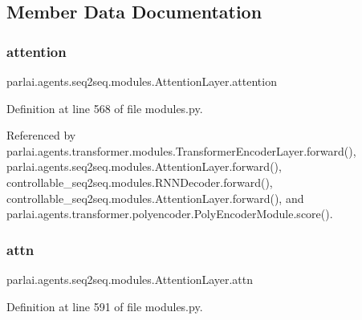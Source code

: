 \subsection{Member Data Documentation}
\mbox{\label{classparlai_1_1agents_1_1seq2seq_1_1modules_1_1AttentionLayer_a8582ed1bb09a75d9a54e812a1b4ae648}} 
\subsubsection{\texorpdfstring{attention}{attention}}
{\footnotesize\ttfamily parlai.\+agents.\+seq2seq.\+modules.\+Attention\+Layer.\+attention}



Definition at line 568 of file modules.\+py.



Referenced by parlai.\+agents.\+transformer.\+modules.\+Transformer\+Encoder\+Layer.\+forward(), parlai.\+agents.\+seq2seq.\+modules.\+Attention\+Layer.\+forward(), controllable\+\_\+seq2seq.\+modules.\+R\+N\+N\+Decoder.\+forward(), controllable\+\_\+seq2seq.\+modules.\+Attention\+Layer.\+forward(), and parlai.\+agents.\+transformer.\+polyencoder.\+Poly\+Encoder\+Module.\+score().

\mbox{\label{classparlai_1_1agents_1_1seq2seq_1_1modules_1_1AttentionLayer_a5bbb3d93ee56f0a41562141beb302da7}} 
\subsubsection{\texorpdfstring{attn}{attn}}
{\footnotesize\ttfamily parlai.\+agents.\+seq2seq.\+modules.\+Attention\+Layer.\+attn}



Definition at line 591 of file modules.\+py.




